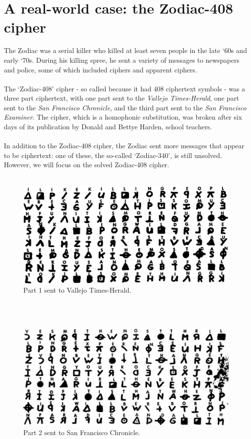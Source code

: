 \documentclass[Lau,binding=0.6cm,oneside]{sapthesis}
\begin{document}
\chapter{A real-world case: the Zodiac-408 cipher}
The Zodiac was a serial killer who killed at least seven people in the late `60s and early `70s. During his killing spree, he sent a variety of messages to newspapers and police, some of which included ciphers and apparent ciphers.\\\\
The `Zodiac-408' cipher - so called because it had 408 ciphertext symbols - was a three part ciphertext, with one part sent to the \textit{Vallejo Times-Herald}, one part sent to the \textit{San Francisco Chronicle}, and the third part sent to the \textit{San Francisco Examiner}. The cipher, which is a homophonic substitution, was broken after six days of its publication by Donald and Bettye Harden, school teachers\supercite{solved_zodiac_408_cipher}.\\\\
In addition to the Zodiac-408 cipher, the Zodiac sent more messages that appear to be ciphertext: one of these, the so-called `Zodiac-340', is still unsolved. However, we will focus on the solved Zodiac-408 cipher.\\\\

\begin{figure}[H]
\includegraphics[scale=0.7]{zodiac_408_1}
\centering
\caption{Part 1 sent to Vallejo Times-Herald.}
\centering
\end{figure}
\ \\\\
\begin{figure}[H]
\includegraphics[scale=0.7]{zodiac_408_2}
\centering
\caption{Part 2 sent to San Francisco Chronicle.}
\centering
\end{figure}
\end{document}
